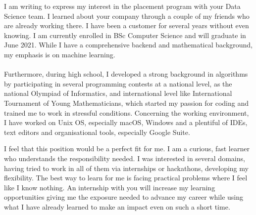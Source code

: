 \documentclass[12pt, a4paper]{awesome-cv}
\begin{document}
\makecvheader

\makelettertitle

\begin{cvletter}
I am writing to express my interest in the placement program with your Data Science team. I learned about your company through a couple of my friends who are already working there. I have been a customer for several years without even knowing. 
I am currently enrolled in BSc Computer Science and will graduate in June 2021. While I have a comprehensive backend and mathematical background, my emphasis is on machine learning. \\ \\
Furthermore, during high school, I developed a strong background in algorithms by participating in several programming contests at a national level, as the national Olympiad of Informatics, and international level like International Tournament of Young Mathematicians, which started my passion for coding and trained me to work in stressful conditions. Concerning the working environment, I have worked on Unix OS, especially macOS, Windows and a plentiful of IDEs, text editors and organisational tools, especially Google Suite.


I feel that this position would be a perfect fit for me. I am a curious, fast learner who understands the responsibility needed. I was interested in several domains, having tried to work in all of them via internships or hackathons, developing my flexibility. The best way to learn for me is facing practical problems where I feel like I know nothing. An internship with you will increase my learning opportunities giving me the exposure needed to advance my career while using what I have already learned to make an impact even on such a short time.



\end{cvletter}
\end{document}
